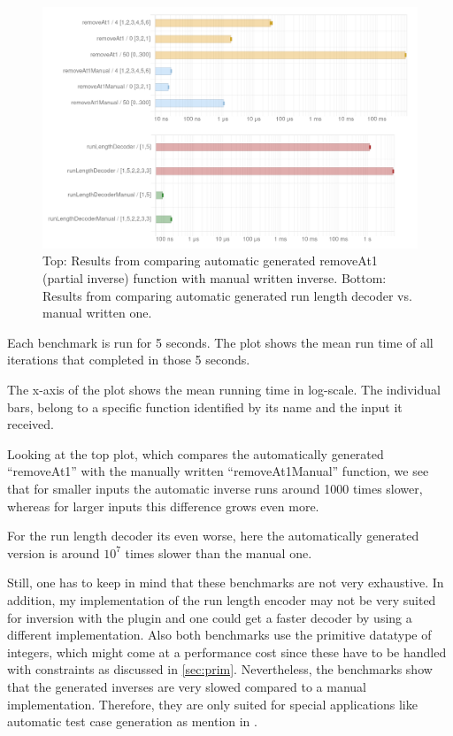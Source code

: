 \documentclass[12pt,a4paper, dvipsnames,usenames]{article}
\begin{document}
\begin{figure}[h]
\begin{minipage}{1.0\linewidth}
  \begin{center}
    \includegraphics[scale=1.4]{resources/benchmark.png}
     \caption{\small
       {\color{gray!25!black!60} Top:}
       Results from comparing automatic generated removeAt1 (partial inverse)
       function with manual written inverse.
       {\color{gray!25!black!60} Bottom:}
       Results from comparing automatic generated run length decoder
       vs. manual written one.
     }
     \label{fig:bench}
  \end{center}
\end{minipage}
\end{figure}

Each benchmark is run for 5 seconds. The plot shows the mean run time of
all iterations that completed in those 5 seconds.

The x-axis of the plot shows the mean running time in log-scale. The
individual bars, belong to a specific function identified by its
name and the input it received.

Looking at the top plot, which compares the automatically generated
``removeAt1'' with the manually written ``removeAt1Manual'' function,
we see that for smaller inputs the automatic inverse runs
around 1000 times slower, whereas for larger inputs this difference grows
even more.

For the run length decoder its even worse, here the automatically
generated version is around $10^7$ times slower than the manual one.

Still, one has to keep in mind that these benchmarks are not very exhaustive.
In addition, my implementation
of the run length encoder may not be very suited for inversion
with the plugin and one could get a faster decoder by using
a different implementation. Also both benchmarks use the primitive
datatype of integers, which might come at a performance cost
since these have to be handled with constraints as discussed in
\cref{sec:prim}. Nevertheless, the benchmarks show that the generated
inverses are very slowed compared to a manual implementation.
Therefore, they are only suited for special applications like automatic
test case generation as mention in \cite{teegen2021haskell}.
\end{document}
